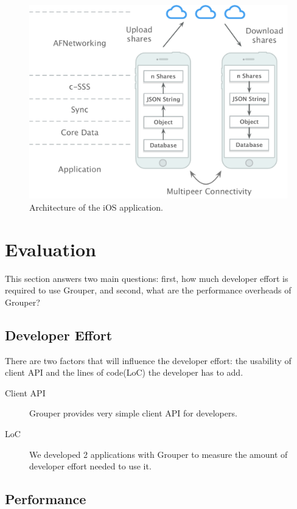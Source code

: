 \documentclass[twocolumn,10pt]{article}
\begin{document}
 \begin{figure}[t]
	\centering
	\includegraphics[scale=0.35]{architecture}
	\caption{Architecture of the iOS application.}
\end{figure}

\section{Evaluation}

This section answers two main questions:  first, how much developer effort is required to use Grouper, and second, what are the performance overheads of Grouper?

\subsection{Developer Effort}

There are two factors that will influence the developer effort: the usability of client API and the lines of code(LoC) the developer has to add.

\begin{description}
	\item[Client API] Grouper provides very simple client API for developers.
	\item[LoC] We developed 2 applications with Grouper to measure the amount of developer effort needed to use it.
\end{description}

\subsection{Performance}
\end{document}
